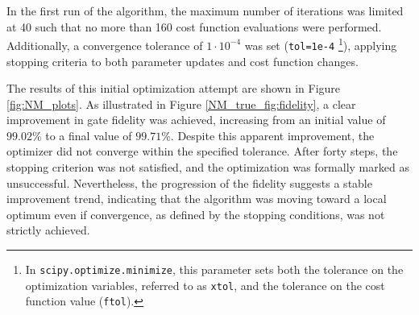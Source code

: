 In the first run of the algorithm, the maximum number of iterations was limited at 40 such that no more than 160 cost function evaluations were performed.
Additionally, a convergence tolerance of $1\cdot10^{-4}$ was set (\texttt{tol=1e-4} \footnote{In \texttt{scipy.optimize.minimize}, this parameter sets both the tolerance on the optimization variables, referred to as \texttt{xtol}, and the tolerance on the cost function value (\texttt{ftol}).}), applying stopping criteria to both parameter updates and cost function changes.

The results of this initial optimization attempt are shown in Figure \ref{fig:NM_plots}. As illustrated in Figure \ref{NM_true_fig:fidelity}, a clear improvement in gate fidelity was achieved, increasing from an initial value of $99.02\%$ to a final value of $99.71\%$.
Despite this apparent improvement, the optimizer did not converge within the specified tolerance. After forty steps, the stopping criterion was not satisfied, and the optimization was formally marked as unsuccessful. 
Nevertheless, the progression of the fidelity suggests a stable improvement trend, indicating that the algorithm was moving toward a local optimum even if convergence, as defined by the stopping conditions, was not strictly achieved.

